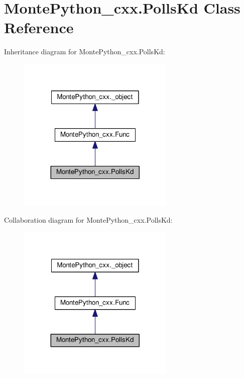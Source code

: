 \hypertarget{classMontePython__cxx_1_1PollsKd}{}\section{Monte\+Python\+\_\+cxx.\+Polls\+Kd Class Reference}
\label{classMontePython__cxx_1_1PollsKd}


Inheritance diagram for Monte\+Python\+\_\+cxx.\+Polls\+Kd\+:
\nopagebreak
\begin{figure}[H]
\begin{center}
\leavevmode
\includegraphics[width=212pt]{classMontePython__cxx_1_1PollsKd__inherit__graph}
\end{center}
\end{figure}


Collaboration diagram for Monte\+Python\+\_\+cxx.\+Polls\+Kd\+:
\nopagebreak
\begin{figure}[H]
\begin{center}
\leavevmode
\includegraphics[width=212pt]{classMontePython__cxx_1_1PollsKd__coll__graph}
\end{center}
\end{figure}
